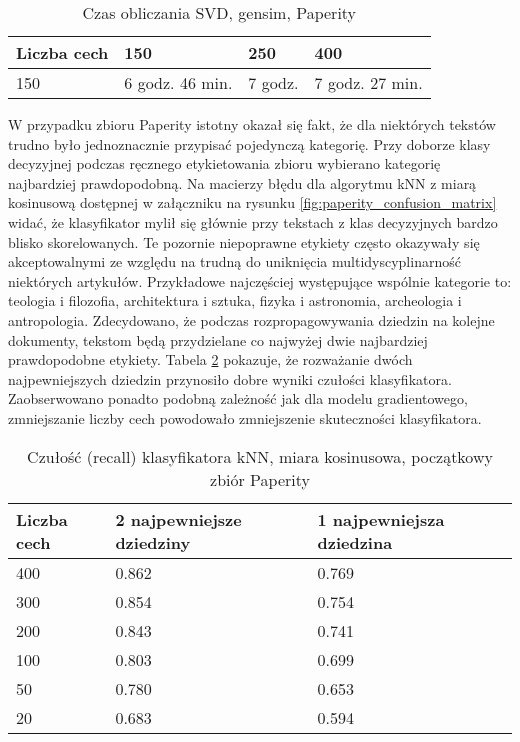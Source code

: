 \documentclass{pracamgr}
\begin{document}
\begin{table}[]
\centering
\begin{tabular}{@{}llll@{}}
\toprule
Liczba cech & 150 & 250 & 400 \\ \midrule
150 & 6 godz. 46 min. & 7 godz. & 7 godz. 27 min. \\ \bottomrule
\end{tabular}
\caption{Czas obliczania SVD, gensim, Paperity}
\label{gensim:running_times}
\end{table}

W przypadku zbioru Paperity istotny okazał się fakt, że dla niektórych tekstów trudno było jednoznacznie przypisać pojedynczą kategorię. Przy doborze klasy decyzyjnej podczas ręcznego etykietowania zbioru wybierano kategorię najbardziej prawdopodobną. Na macierzy błędu dla algorytmu kNN z miarą kosinusową dostępnej w załączniku na rysunku \ref{fig:paperity_confusion_matrix} widać, że klasyfikator mylił się głównie przy tekstach z klas decyzyjnych bardzo blisko skorelowanych. Te pozornie niepoprawne etykiety często okazywały się akceptowalnymi ze względu na trudną do uniknięcia multidyscyplinarność niektórych artykułów. Przykładowe najczęściej występujące wspólnie kategorie to: teologia i filozofia, architektura i sztuka, fizyka i astronomia, archeologia i antropologia. Zdecydowano, że podczas rozpropagowywania dziedzin na kolejne dokumenty, tekstom będą przydzielane co najwyżej dwie najbardziej prawdopodobne etykiety. Tabela \ref{kNN-accuracy-initial-set} pokazuje, że rozważanie dwóch najpewniejszych dziedzin przynosiło dobre wyniki czułości klasyfikatora. Zaobserwowano ponadto podobną zależność jak dla modelu gradientowego, zmniejszanie liczby cech powodowało zmniejszenie skuteczności klasyfikatora. 

\begin{table}[]
\centering
\begin{tabular}{@{}lll@{}}
\toprule
Liczba cech & 2 najpewniejsze dziedziny & 1 najpewniejsza dziedzina \\ \midrule
400         & 0.862                  & 0.769                 \\
300         & 0.854                  & 0.754                 \\
200         & 0.843                  & 0.741                 \\
100         & 0.803                  & 0.699                 \\
50          & 0.780                  & 0.653                 \\
20          & 0.683                  & 0.594                 \\ \bottomrule
\end{tabular}
\caption{Czułość (recall) klasyfikatora kNN, miara kosinusowa, początkowy zbiór Paperity}
\label{kNN-accuracy-initial-set}
\end{table}
\end{document}
